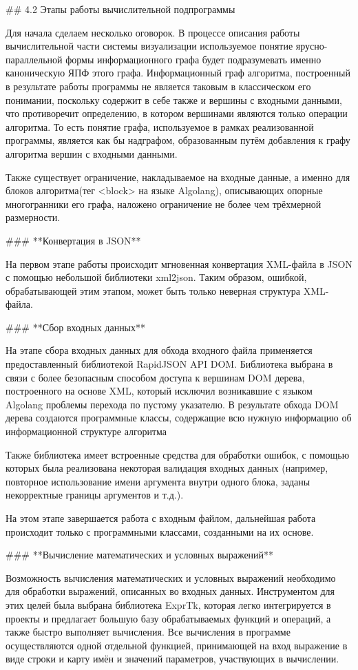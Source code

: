 ## 4.2 Этапы работы вычислительной подпрограммы

Для начала сделаем несколько оговорок. В процессе описания работы вычислительной части системы визуализации используемое понятие ярусно-параллельной формы информационного графа будет подразумевать именно каноническую ЯПФ этого графа. Информационный граф алгоритма, построенный в результате работы программы не является таковым в классическом его понимании, поскольку содержит в себе также и вершины с входными данными, что противоречит определению, в котором вершинами являются только операции алгоритма. То есть понятие графа, используемое в рамках реализованной программы, является как бы надграфом, образованным путём добавления к графу алгоритма вершин с входными данными.

Также существует ограничение, накладываемое на входные данные, а именно для блоков алгоритма(тег <block> на языке Algolang), описывающих опорные многогранники его графа, наложено ограничение не более чем трёхмерной размерности.

### **Конвертация в JSON**

На первом этапе работы происходит мгновенная конвертация XML-файла в JSON с помощью небольшой библиотеки xml2json. Таким образом, ошибкой, обрабатывающей этим этапом, может быть только неверная структура XML-файла.

### **Сбор входных данных**

На этапе сбора входных данных для обхода входного файла применяется предоставленный библиотекой RapidJSON API DOM. Библиотека выбрана в связи с более безопасным способом доступа к вершинам DOM дерева, построенного на основе XML, который исключил возникавшие с языком Algolang проблемы перехода по пустому указателю. В результате обхода DOM дерева создаются программные классы, содержащие всю нужную информацию об информационной структуре алгоритма

Также библиотека имеет встроенные средства для обработки ошибок, с помощью которых была реализована некоторая валидация входных данных (например, повторное использование имени аргумента внутри одного блока, заданы некорректные границы аргументов и т.д.).

На этом этапе завершается работа с входным файлом, дальнейшая работа происходит только с программными классами, созданными на их основе.

### **Вычисление математических и условных выражений**

Возможность вычисления математических и условных выражений необходимо для обработки выражений, описанных во входных данных. Инструментом для этих целей была выбрана библиотека ExprTk, которая легко интегрируется в проекты и предлагает большую базу обрабатываемых функций и операций, а также быстро выполняет вычисления. Все вычисления в программе осуществляются одной отдельной функцией, принимающей на вход выражение в виде строки и карту имён и значений параметров, участвующих в вычислении. 

